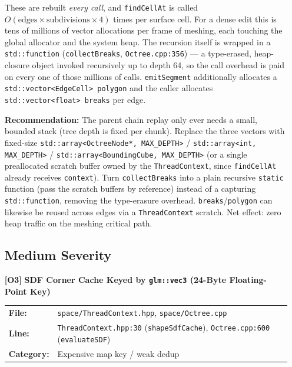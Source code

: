 \documentclass[a4paper,12pt]{article}
\newcommand{\severitybox}[2]{%
  \colorbox{#1}{\makebox[2.5cm][c]{\textcolor{white}{\textbf{#2}}}}%
}
\begin{document}
\begin{enumerate}[leftmargin=*]
  These are rebuilt \emph{every call}, and \texttt{findCellAt} is called
  $O(\text{edges} \times \text{subdivisions} \times 4)$ times per surface cell.
  For a dense edit this is tens of millions of vector allocations per frame of
  meshing, each touching the global allocator and the system heap. The recursion
  itself is wrapped in a \texttt{std::function} (\texttt{collectBreaks},
  \texttt{Octree.cpp:356}) — a type-erased, heap-closure object invoked
  recursively up to depth 64, so the call overhead is paid on every one of those
  millions of calls. \texttt{emitSegment} additionally allocates a
  \texttt{std::vector<EdgeCell> polygon} and the caller allocates
  \texttt{std::vector<float> breaks} per edge.

  \textbf{Recommendation:}
  The parent chain replay only ever needs a small, bounded stack (tree depth is
  fixed per chunk). Replace the three vectors with fixed-size
  \texttt{std::array<OctreeNode*, MAX\_DEPTH>} / \texttt{std::array<int,
  MAX\_DEPTH>} / \texttt{std::array<BoundingCube, MAX\_DEPTH>} (or a single
  preallocated scratch buffer owned by the \texttt{ThreadContext}, since
  \texttt{findCellAt} already receives \texttt{context}). Turn \texttt{collectBreaks}
  into a plain recursive \texttt{static} function (pass the scratch buffers by
  reference) instead of a capturing \texttt{std::function}, removing the
  type-erasure overhead. \texttt{breaks}/\texttt{polygon} can likewise be
  reused across edges via a \texttt{ThreadContext} scratch. Net effect: zero
  heap traffic on the meshing critical path.

\subsection{Medium Severity}

\item[\textbf{[O3]}] \textbf{SDF Corner Cache Keyed by \texttt{glm::vec3} (24-Byte Floating-Point Key)}
  \hfill \severitybox{mediumcolor}{MEDIUM}

  \begin{tabular}{ll}
    \textbf{File:} & \texttt{space/ThreadContext.hpp}, \texttt{space/Octree.cpp} \\
    \textbf{Line:} & \texttt{ThreadContext.hpp:30} (\texttt{shapeSdfCache}),
                      \texttt{Octree.cpp:600} (\texttt{evaluateSDF}) \\
    \textbf{Category:} & Expensive map key / weak dedup \\
  \end{tabular}


\end{enumerate}
\end{document}
